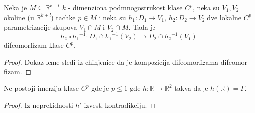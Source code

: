 \documentclass[a4paper,12pt]{article}
\newcommand{\RR}{\mathbb{R}}
\begin{document}
\begin{lema}
Neka je $M \subseteq \RR^{k+l}$ $k$ - dimenziona podmnogostrukost klase $C^p$, neka su $V_1, V_2$ okoline (u $\RR^{k+l}$) tachke $p \in M$ i neka su $h_1 : D_1 \to V_1$, $h_2: D_2 \to V_2$ dve lokalne $C^p$ parametrizacije skupova $V_1 \cap M$ i $V_2 \cap M$. Tada je
\[h_2 \circ {h_1}^{-1} : D_1 \cap {h_1}^{-1}(V_2) \to D_2 \cap {h_2}^{-1}(V_1)\]
difeomorfizam klase $C^p$.
\end{lema}
\begin{proof}
Dokaz leme sledi iz chinjenice da je kompozicija difeomorfizama difeomor-fizam.
\end{proof}

\begin{tvr}
Ne postoji imerzija klase $C^p$ gde je $p \leq 1$ gde $h: \RR \to \RR^2$ takva da je $h(\RR) = \Gamma$.
\end{tvr}
\begin{proof}
Iz neprekidnosti $h'$ izvesti kontradikciju.
\end{proof}
\end{document}
